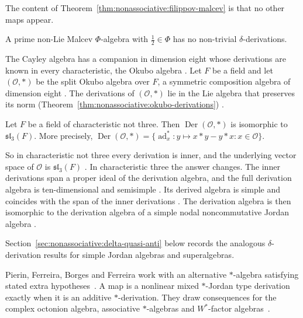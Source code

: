 The content of Theorem~\ref{thm:nonassociative:filippov-malcev} is that no
other maps appear.

\begin{theorem}
\label{thm:nonassociative:filippov-malcev}
A prime non-Lie Malcev $\Phi$-algebra with $\tfrac{1}{2}\in\Phi$ has no
non-trivial $\delta$-derivations.
\end{theorem}

The Cayley algebra has a companion in dimension eight whose derivations are
known in every characteristic, the Okubo algebra \cite[p.~4]{Elduque2015}. Let
$F$ be a field and let $(\mathcal{O},*)$ be the split Okubo algebra over $F$,
a symmetric composition algebra of dimension eight \cite[p.~4]{Elduque2015}.
The derivations of $(\mathcal{O},*)$ lie in the Lie algebra that preserves its
norm (Theorem~\ref{thm:nonassociative:okubo-derivations})
\cite[p.~5]{Elduque2015}.\begin{theorem}\label{thm:nonassociative:okubo-derivations} Let $F$
be a field of characteristic not three. Then
$\operatorname{Der}(\mathcal{O},*)$ is isomorphic to $\mathfrak{sl}_3(F)$.
More precisely,
$\operatorname{Der}(\mathcal{O},*)=\{\operatorname{ad}^{*}_x\colon y\mapsto
x*y-y*x : x\in\mathcal{O}\}$. \end{theorem}

So in characteristic not three every derivation is inner, and the underlying
vector space of $\mathcal{O}$ is $\mathfrak{sl}_3(F)$
\cite[p.~5]{Elduque2015}. In characteristic three the answer changes. The
inner derivations span a proper ideal of the derivation algebra, and the full
derivation algebra is ten-dimensional and semisimple \cite[Theorem~9,
p.~6]{Elduque2015}. Its derived algebra is simple and coincides with the span
of the inner derivations \cite[Theorem~9, p.~6]{Elduque2015}. The derivation
algebra is then isomorphic to the derivation algebra of a simple nodal
noncommutative Jordan algebra \cite[Theorem~9, p.~6]{Elduque2015}.

Section~\ref{sec:nonassociative:delta-quasi-anti} below records the
analogous $\delta$-derivation results for simple Jordan algebras and
superalgebras.

Pierin,
Ferreira, Borges and Ferreira work with an alternative $*$-algebra satisfying
stated extra hypotheses~\cite{WlAboutTheAdditivityOfANonlinear2025}. A map is a nonlinear mixed $*$-Jordan
type derivation exactly when it is an additive $*$-derivation. They draw %
consequences for the complex octonion algebra, associative $*$-algebras and
$W^*$-factor algebras~\cite{WlAboutTheAdditivityOfANonlinear2025}.

